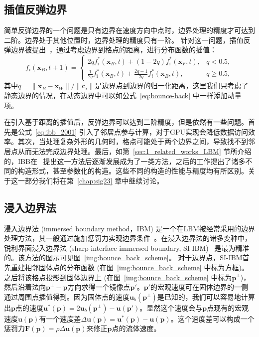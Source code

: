 \subsection{插值反弹边界}
简单反弹边界的一个问题是只有边界在速度方向中点时，边界处理的精度才可达到二阶。边界处于其他位置时，边界处理的精度只有一阶。
针对这一问题，插值反弹边界被提出~\citep{Bouzidi-2001}，通过考虑边界到格点的距离，进行分布函数的插值：
\begin{equation}\label{eq:ibb_2001}
    f_i(\mathbf{x}_B, t+1) = 
    \begin{cases}
        2 q f^{*}_{\bar{\imath}}(\mathbf{x}_B, t)+(1-2 q) f^{*}_{\bar{\imath}}(\mathbf{x}_{F}, t), & q < 0.5, \\
        \frac{1}{2 q} f^{*}_{\bar{\imath}}(\mathbf{x}_B, t)+\frac{2 q-1}{2 q} f^{*}_i(\mathbf{x}_B, t), & q \geq 0.5,
    \end{cases}
\end{equation}
其中$q=\|\mathbf{x}_B - \mathbf{x}_W\|/\|\bm{c}_i\|$是边界点到边界的归一化距离，这里我们只考虑了静态边界的情况，在动态边界中可以如公式~\ref{eq:bounce-back} 中一样添加动量项。

在引入基于距离的插值后，反弹边界可以达到二阶精度，但是依然有一些问题。首先是公式~\ref{eq:ibb_2001} 引入了邻居点参与计算，对于GPU实现会降低数据访问效率。其次，当处理复杂外形的几何时，格点可能处于两个边界之间，导致找不到邻居点从而无法完成边界处理。最后，如第~\ref{sec:1_related_works_LBM} 节所介绍的，IBB在~\citet{Bouzidi-2001} 提出这一方法后逐渐发展成为了一类方法，之后的工作提出了诸多不同的构造形式，甚至参数化的构造。这些不同的构造的性能与精度均有所区别。关于这一部分我们将在第~\ref{chap:sig23} 章中继续讨论。

\subsection{浸入边界法}
浸入边界法 (immersed boundary method，IBM) 是一个在LBM被经常采用的边界处理方法，其一般通过施加惩罚力实现边界条件~\citep{patel2018diffuse,mittal-2008,Li-2020}。在浸入边界法的诸多变种中，锐利界面浸入边界法 (sharp-interface immersed boundary, SI-IBM)~\citep{mittal-2008} 是最为精准的。该方法的图示可见图~\ref{img:bounce_back_scheme}。
对于边界点，SI-IBM首先重建相邻固体点的分布函数 (在图~\ref{img:bounce_back_scheme} 中标为方框)。之后将该格点投影到固体边界上 (在图~\ref{img:bounce_back_scheme} 中标为$\bm{p}^\perp$)，然后沿着法向$\bm{p}^\perp\!-\!\bm{p}$方向求得一个镜像点$\bm{p}'$。$\bm{p}'$的宏观速度可在固体边界的一侧通过周围点插值得到。因为固体点的速度$\bm{u}_b(\bm{p}^\perp)$是已知的，我们可以容易地计算出$\bm{p}$点的速度$\bm{u}^*(\bm{p}) = 2\bm{u}_b(\bm{p}^\perp) - \bm{u}(\bm{p}')$。显然这个速度会与$\bm{p}$点现有的宏观速度$\bm{u}(\bm{p})$有一个速度差$\Delta\bm{u}(\bm{p}) = \bm{u}^*(\bm{p}) - \bm{u}(\bm{p})$。这个速度差可以构成一个惩罚力$\bm{F}(\bm{p}) = \rho\Delta\bm{u}(\bm{p})$来修正$\bm{p}$点的流体速度。

